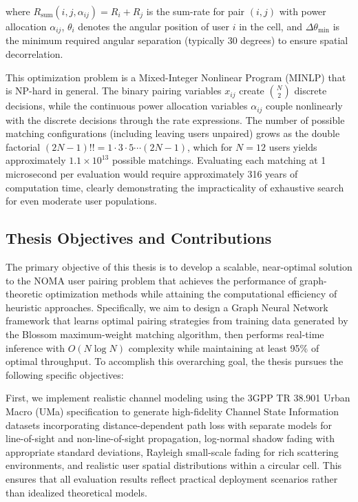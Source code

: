 where $R_{\text{sum}}(i,j,\alpha_{ij}) = R_i + R_j$ is the sum-rate for pair $(i,j)$ with power allocation $\alpha_{ij}$, $\theta_i$ denotes the angular position of user $i$ in the cell, and $\Delta\theta_{\min}$ is the minimum required angular separation (typically 30 degrees) to ensure spatial decorrelation.

This optimization problem is a Mixed-Integer Nonlinear Program (MINLP) that is NP-hard in general. The binary pairing variables $x_{ij}$ create $\binom{N}{2}$ discrete decisions, while the continuous power allocation variables $\alpha_{ij}$ couple nonlinearly with the discrete decisions through the rate expressions. The number of possible matching configurations (including leaving users unpaired) grows as the double factorial $(2N-1)!! = 1 \cdot 3 \cdot 5 \cdots (2N-1)$, which for $N=12$ users yields approximately $1.1 \times 10^{13}$ possible matchings. Evaluating each matching at 1 microsecond per evaluation would require approximately 316 years of computation time, clearly demonstrating the impracticality of exhaustive search for even moderate user populations.

\subsection{Thesis Objectives and Contributions}

The primary objective of this thesis is to develop a scalable, near-optimal solution to the NOMA user pairing problem that achieves the performance of graph-theoretic optimization methods while attaining the computational efficiency of heuristic approaches. Specifically, we aim to design a Graph Neural Network framework that learns optimal pairing strategies from training data generated by the Blossom maximum-weight matching algorithm, then performs real-time inference with $O(N \log N)$ complexity while maintaining at least 95\% of optimal throughput. To accomplish this overarching goal, the thesis pursues the following specific objectives:

First, we implement realistic channel modeling using the 3GPP TR 38.901 Urban Macro (UMa) specification to generate high-fidelity Channel State Information datasets incorporating distance-dependent path loss with separate models for line-of-sight and non-line-of-sight propagation, log-normal shadow fading with appropriate standard deviations, Rayleigh small-scale fading for rich scattering environments, and realistic user spatial distributions within a circular cell. This ensures that all evaluation results reflect practical deployment scenarios rather than idealized theoretical models.

